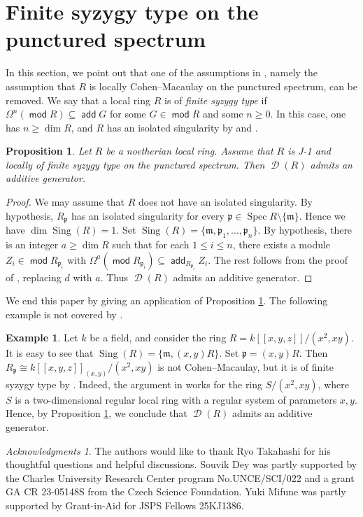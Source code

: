 \documentclass[10pt]{amsart}
\newtheorem{prop}[thm]{Proposition}
\theoremstyle{definition}
\newtheorem{ex}[thm]{Example}
\theoremstyle{remark}
\newtheorem*{ac}{Acknowledgments}
\numberwithin{equation}{thm}
\def\add{\operatorname{\mathsf{add}}}
\def\d{\operatorname{\mathscr{D}}}
\def\dim{\operatorname{dim}}
\def\ge{\geqslant}
\def\le{\leqslant}
\def\m{\mathfrak{m}}
\def\mod{\operatorname{\mathsf{mod}}}
\def\p{\mathfrak{p}}
\def\Sing{\operatorname{Sing}}
\def\Spec{\operatorname{Spec}}
\begin{document}
\section{Finite syzygy type on the punctured spectrum}
In this section, we point out that one of the assumptions in \cite[Theorem 4.7]{MT}, namely the assumption that $R$ is locally Cohen--Macaulay on the punctured spectrum, can be removed.
We say that a local ring $R$ is of {\em finite syzygy type} if $\Omega^{n}(\mod R)\subseteq \add G$ for some $G\in\mod R$ and some $n\ge0$.
In this case, one has $n\ge\dim R$, and $R$ has an isolated singularity by \cite[Proposition 4.6]{DLMO} and \cite[Corollary 3.12]{DKLO}.
\begin{prop}\label{MT4.7}
Let $R$ be a noetherian local ring.
Assume that $R$ is J-1 and locally of finite syzygy type on the punctured spectrum.
Then $\d(R)$ admits an additive generator.
\end{prop}
\begin{proof}
We may assume that $R$ does not have an isolated singularity.
By hypothesis, $R_{\p}$ has an isolated singularity for every $\p\in\Spec R\setminus\{\m\}$.
Hence we have $\dim\Sing(R)=1$.
Set $\Sing(R)=\{\m,\p_{1},\ldots,\p_{n}\}$.
By hypothesis, there is an integer $a\ge\dim R$ such that for each $1\le i\le n$, there exists a module $Z_{i}\in\mod R_{\p_{i}}$ with $\Omega^{a}(\mod R_{\p_{i}})\subseteq\add_{R_{\p_{i}}}Z_{i}$.
The rest follows from the proof of \cite[Theorem 4.7]{MT}, replacing $d$ with $a$.
Thus $\d(R)$ admits an additive generator.
\end{proof}
We end this paper by giving an application of Proposition \ref{MT4.7}.
The following example is not covered by \cite[Theorem 4.7]{MT}.
\begin{ex}
Let $k$ be a field, and consider the ring $R=k[\![x,y,z]\!]/(x^2,xy)$.
It is easy to see that $\Sing(R)=\{\m,(x,y)R\}$.
Set $\p=(x,y)R$.
Then $R_{\p}\cong k[\![x,y,z]\!]_{(x,y)}/(x^2,xy)$ is not Cohen--Macaulay, but it is of finite syzygy type by \cite[Example 3.17(2)]{DKLO}.
Indeed, the argument in \cite[Example 3.17(2)]{DKLO} works for the ring $S/(x^2,xy)$, where $S$ is a two-dimensional regular local ring with a regular system of parameters $x,y$.
Hence, by Proposition \ref{MT4.7}, we conclude that $\d(R)$ admits an additive generator.
\end{ex}
\begin{ac}
The authors would like to thank Ryo Takahashi for his thoughtful questions and helpful discussions.
Souvik Dey was partly supported by the Charles University Research Center program No.UNCE/SCI/022 and a grant GA CR 23-05148S from the Czech Science Foundation.
Yuki Mifune was partly supported by Grant-in-Aid for JSPS Fellows 25KJ1386.
\end{ac}
\end{document}

